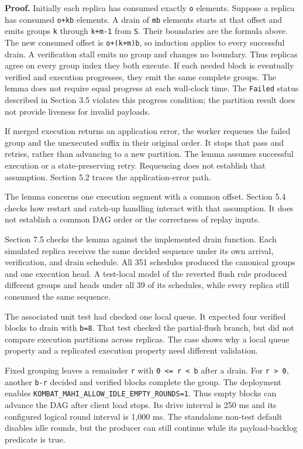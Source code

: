 \documentclass[11pt]{article}
\begin{document}
\textbf{Proof.} Initially each replica has consumed exactly \texttt{o} elements. Suppose a replica has consumed \texttt{o+kb} elements. A drain of \texttt{mb} elements starts at that offset and emits groups \texttt{k} through \texttt{k+m-1} from \texttt{S}. Their boundaries are the formula above. The new consumed offset is \texttt{o+(k+m)b}, so induction applies to every successful drain. A verification stall emits no group and changes no boundary. Thus replicas agree on every group index they both execute. If each needed block is eventually verified and execution progresses, they emit the same complete groups. The lemma does not require equal progress at each wall-clock time. The \texttt{Failed} status described in Section 3.5 violates this progress condition; the partition result does not provide liveness for invalid payloads.

If merged execution returns an application error, the worker requeues the failed group and the unexecuted suffix in their original order. It stops that pass and retries, rather than advancing to a new partition. The lemma assumes successful execution or a state-preserving retry. Requeueing does not establish that assumption. Section 5.2 traces the application-error path. \cite{R12}

The lemma concerns one execution segment with a common offset. Section 5.4 checks how restart and catch-up handling interact with that assumption. It does not establish a common DAG order or the correctness of replay inputs.

Section 7.5 checks the lemma against the implemented drain function. Each simulated replica receives the same decided sequence under its own arrival, verification, and drain schedule. All 351 schedules produced the canonical groups and one execution head. A test-local model of the reverted flush rule produced different groups and heads under all 39 of its schedules, while every replica still consumed the same sequence. \cite{R30}

The associated unit test had checked one local queue. It expected four verified blocks to drain with \texttt{b=8}. That test checked the partial-flush branch, but did not compare execution partitions across replicas. The case shows why a local queue property and a replicated execution property need different validation. \cite{R15}

Fixed grouping leaves a remainder \texttt{r} with \texttt{0 <= r < b} after a drain. For \texttt{r > 0}, another \texttt{b-r} decided and verified blocks complete the group. The deployment enables \texttt{KOMBAT\_\allowbreak MAHI\_\allowbreak ALLOW\_\allowbreak IDLE\_\allowbreak EMPTY\_\allowbreak ROUNDS=1}. Thus empty blocks can advance the DAG after client load stops. Its drive interval is 250 ms and its configured logical round interval is 1,000 ms. The standalone non-test default disables idle rounds, but the producer can still continue while its payload-backlog predicate is true. \cite{R12}
\end{document}
